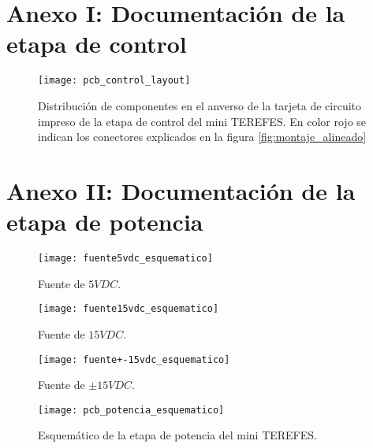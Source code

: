 \appendix
\clearpage
\addappheadtotoc
\appendixpage


\chapter{Anexo I: Documentación de la etapa de control}\label{anexo1}
\newpage

\label{esquematico_control}

\label{placa_control}

\begin{figure}[!htb]
\centering
\texttt{[image: pcb\_control\_layout]}
  \caption{Distribución de componentes en el anverso de la tarjeta de circuito impreso de la etapa de control del mini TEREFES. En color rojo se indican los conectores explicados en la figura \ref{fig:montaje_alineado}}\label{fig:pcb_control_layout}
\end{figure}


\chapter{Anexo II: Documentación de la etapa de potencia}\label{anexo2}
\newpage

\begin{figure}[!htb]
\centering
\texttt{[image: fuente5vdc\_esquematico]}
  \caption{Fuente de $5VDC$.}\label{fig:fuente5vdc_esquematico}
\end{figure}


\begin{figure}[!htb]
\centering
\texttt{[image: fuente15vdc\_esquematico]}
  \caption{Fuente de $15VDC$.}\label{fig:fuente15vdc_esquematico}
\end{figure}


\begin{figure}[!htb]
\centering
\texttt{[image: fuente+-15vdc\_esquematico]}
  \caption{Fuente de $\pm15VDC$.}\label{fig:fuente+-15vdc_esquematico}
\end{figure}

\begin{figure}[!htb]
\centering
\texttt{[image: pcb\_potencia\_esquematico]}
  \caption{Esquemático de la etapa de potencia del mini TEREFES.}\label{fig:pcb_potencia_esquematico}
\end{figure}

